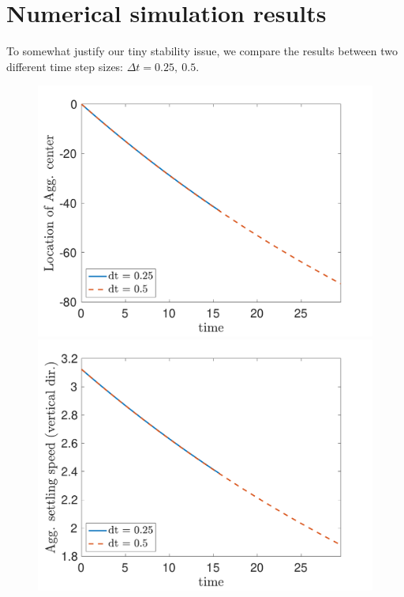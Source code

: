 \section{Numerical simulation results}
To somewhat justify our tiny stability issue, we compare the results between two different time step sizes: $\Delta t = 0.25 , \ 0.5$.
\begin{figure}[ht]
	\begin{center}
		\includegraphics[scale=0.33]{./figures/fig_NC50_compare_dt_cm3_all}
		\includegraphics[scale=0.33]{./figures/fig_NC50_compare_dt_Ua3_all}

\end{center}
\end{figure}
